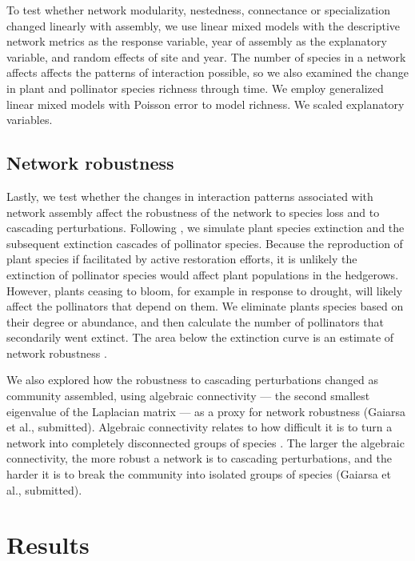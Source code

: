 \documentclass[12pt]{article}
\begin{document}
To test whether network modularity, nestedness, connectance or
specialization changed linearly with assembly, we use linear mixed
models with the descriptive network metrics as the response variable,
year of assembly as the explanatory variable, and random effects of
site and year. The number of species in a network affects affects the
patterns of interaction possible, so we also examined the change in
plant and pollinator species richness through time. We employ
generalized linear mixed models with Poisson error to model
richness. We scaled explanatory variables.


\subsection*{Network robustness}
Lastly, we test whether the changes in interaction patterns associated
with network assembly affect the robustness of the network to species
loss and to cascading perturbations. Following \cite{Memmott2004}, we
simulate plant species extinction and the subsequent extinction
cascades of pollinator species. Because the reproduction of plant
species if facilitated by active restoration efforts, it is unlikely
the extinction of pollinator species would affect plant populations in
the hedgerows. However, plants ceasing to bloom, for example in
response to drought, will likely affect the pollinators that depend on
them. We eliminate plants species based on their degree or abundance,
and then calculate the number of pollinators that secondarily went
extinct. The area below the extinction curve is an estimate of network
robustness \citep{Memmott2004, bipartite}.

We also explored how the robustness to cascading perturbations changed
as community assembled, using algebraic connectivity --- the second
smallest eigenvalue of the Laplacian matrix
\citep{fiedler1973algebraic} --- as a proxy for network robustness
(Gaiarsa et al., submitted). Algebraic connectivity relates to how
difficult it is to turn a network into completely disconnected groups
of species \citep{costa2007characterization}. The larger the algebraic
connectivity, the more robust a network is to cascading perturbations,
and the harder it is to break the community into isolated groups of
species (Gaiarsa et al., submitted).

\section*{Results}
\label{sec:results}
\end{document}
